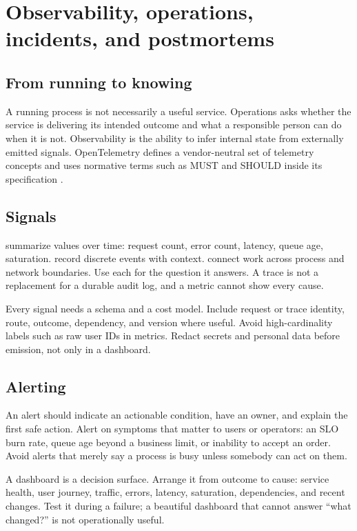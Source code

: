 \chapter{Observability, operations, incidents, and postmortems}

\section{From running to knowing}
A running process is not necessarily a useful service. Operations asks whether
the service is delivering its intended outcome and what a responsible person can
do when it is not. Observability is the ability to infer internal state from
externally emitted signals. OpenTelemetry defines a vendor-neutral set of
telemetry concepts and uses normative terms such as MUST and SHOULD inside its
specification \cite{opentelemetry2026spec}.

\section{Signals}
 summarize values over time: request count, error count, latency,
queue age, saturation.  record discrete events with context.
 connect work across process and network boundaries. Use each for
the question it answers. A trace is not a replacement for a durable audit log,
and a metric cannot show every cause.

Every signal needs a schema and a cost model. Include request or trace identity,
route, outcome, dependency, and version where useful. Avoid high-cardinality
labels such as raw user IDs in metrics. Redact secrets and personal data before
emission, not only in a dashboard.

\section{Alerting}
An alert should indicate an actionable condition, have an owner, and explain the
first safe action. Alert on symptoms that matter to users or operators: an SLO
burn rate, queue age beyond a business limit, or inability to accept an order.
Avoid alerts that merely say a process is busy unless somebody can act on them.

A dashboard is a decision surface. Arrange it from outcome to cause: service
health, user journey, traffic, errors, latency, saturation, dependencies, and
recent changes. Test it during a failure; a beautiful dashboard that cannot
answer “what changed?” is not operationally useful.

